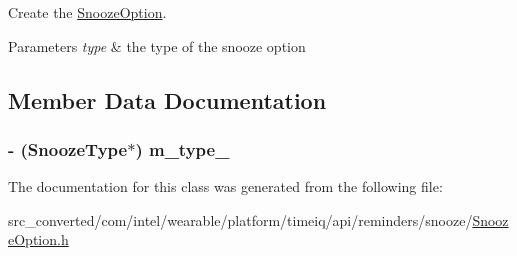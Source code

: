 Create the \hyperlink{interface_snooze_option}{Snooze\+Option}. 


\begin{DoxyParams}{Parameters}
{\em type} & the type of the snooze option \\
\hline
\end{DoxyParams}


\subsection{Member Data Documentation}
\hypertarget{interface_snooze_option_a223d2725a927cfc5d45640881030a988}{}
\subsubsection[{m\+\_\+type\+\_\+}]{\setlength{\rightskip}{0pt plus 5cm}-\/ ({\bf Snooze\+Type}$\ast$) m\+\_\+type\+\_\+}\label{interface_snooze_option_a223d2725a927cfc5d45640881030a988}


The documentation for this class was generated from the following file\+:\begin{DoxyCompactItemize}
\item 
src\+\_\+converted/com/intel/wearable/platform/timeiq/api/reminders/snooze/\hyperlink{_snooze_option_8h}{Snooze\+Option.\+h}\end{DoxyCompactItemize}
